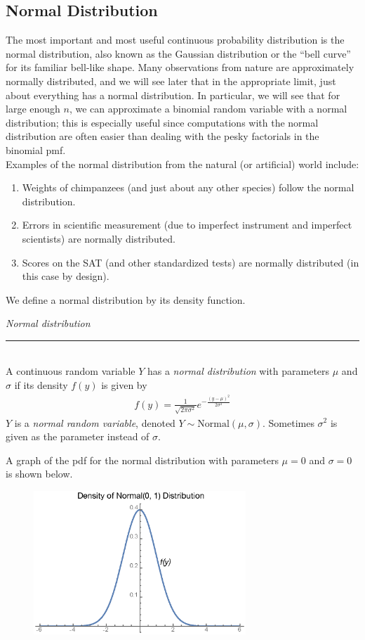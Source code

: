 \documentclass[notes.tex]{subfiles}
\begin{document}

\subsection{Normal Distribution}
The most important and most useful continuous probability distribution is the normal distribution, also known as the Gaussian distribution or the ``bell curve'' for its familiar bell-like shape. Many observations from nature are approximately normally distributed, and we will see later that in the appropriate limit, just about everything has a normal distribution. In particular, we will see that for large enough $n$, we can approximate a binomial random variable with a normal distribution; this is especially useful since computations with the normal distribution are often easier than dealing with the pesky factorials in the binomial pmf.\\

Examples of the normal distribution from the natural (or artificial) world include:
\begin{enumerate}
\item Weights of chimpanzees (and just about any other species) follow the normal distribution.
\item Errors in scientific measurement (due to imperfect instrument and imperfect scientists) are normally distributed.
\item Scores on the SAT (and other standardized tests) are normally distributed (in this case by design).
\end{enumerate}

We define a normal distribution by its density function.

\begin{framed}
\emph{Normal distribution}\\
  \rule{\dimexpr{}\fboxrule}{.1pt} \\
A continuous random variable $Y$ has a \emph{normal distribution} with parameters $\mu$ and $\sigma$ if its density $f(y)$ is given by
\begin{align*}
f(y) = \frac{1}{\sqrt{2 \pi \sigma^2}} e^{-\frac{(y - \mu)^2}{2 \sigma^2}}
\end{align*}
$Y$ is a \emph{normal random variable}, denoted $Y \sim \text{Normal}(\mu, \sigma)$. Sometimes $\sigma^2$ is given as the parameter instead of $\sigma$.
\end{framed}

A graph of the pdf for the normal distribution with parameters $\mu = 0$ and $\sigma = 0$ is shown below.
\begin{figure}[H]
\centering
\includegraphics[width=8cm]{normalpdf2.eps}
\end{figure}
\end{document}
